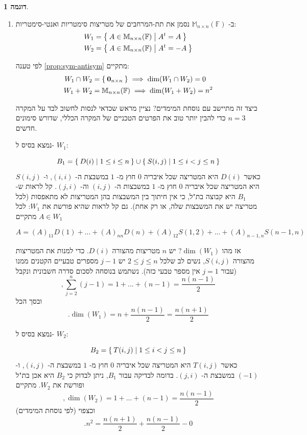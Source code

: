 \documentclass[12pt]{report}
\theoremstyle{plain}
\theoremstyle{definition}
\newtheorem{example}{דוגמה}[chapter]
\newcommand{\F}{\mathbb{F}}
\newcommand{\M}{\mathbb{M}}
\newcommand{\0}{\mathbf{0}}
\begin{document}
\begin{example}
\begin{enumerate}[label=\alph*.]
נציב את המימדים הידועים בנוסחת המימדים ונקבל

$$
.n=n-1+n-1-\dim(H_1\cap H_2) \implies \dim(H_1\cap H_2)=n-2
$$


\item 
ב-
$\M_{n\times n}(\F)$
נסמן את תת-המרחבים של מטריצות סימטריות ואנטי-סימטריות:
$$
\begin{aligned}
W_1&=\Set{A\in \M_{n\times n}(\F)|A^t=A} \\
W_2&=\Set{A\in \M_{n\times n}(\F)|A^t=-A}
\end{aligned}
$$

לפי טענה
\ref{prop:sym-antisym}
מתקיים:
$$
\begin{aligned}
W_1\cap W_2&=\Set{\0_{n\times n}} \implies \dim(W_1\cap W_2)=0 \\
W_1+W_2&=\M_{n\times n}(\F) \implies \dim(W_1+W_2)=n^2
\end{aligned}
$$

כיצד זה מתיישב עם נוסחת המימדים? נציין מראש שכדאי לנסות לחשוב לבד על המקרה
$n=3$
כדי להבין יותר טוב את הפרטים הטכניים של המקרה הכללי, שדורש סימונים חדשים.

נמצא בסיס ל-
$W_1$:

$$
B_1=\Set{D(i)|1\leq i\leq n}\cup\Set{S(i,j)|1\leq i<j\leq n}
$$
כאשר
$D(i)$
היא המטריצה שכל איבריה 
$0$
חוץ מ-
$1$
במשבצת ה-
$(i,i)$,
ו-
$S(i,j)$
היא המטריצה שכל איבריה
$0$
חוץ מ-
$1$
במשבצות ה-
$(i,j)$
וה-
$(j,i)$.
קל לראות ש-
$B_1$
היא קבוצה בת"ל, כי אין חיתוך בין המשבצות בהן המטריצות לא מתאפסות (לכל מטריצה יש את המשבצות שלה, או רק אחת). 
גם קל לראות שהיא פורשת את 
$W_1$: 
לכל 
$A\in W_1$
מתקיים

$$
A=(A)_{11}D(1)+...+(A)_{nn}D(n)+(A)_{12}S(1,2)+...+(A)_{n-1,n}S(n-1,n)
$$

אז מהו
$\dim(W_1)$?
יש 
$n$
מטריצות מהצורה 
$D(i)$.
כדי למנות את המטריצות מהצורה
$S(i,j)$,
נשים לב שלכל
$2\leq j\leq n$
יש 
$j-1$
מספרים טבעיים הקטנים ממנו (עבור 
$j=1$
אין מספר טבעי כזה). נשתמש בנוסחה לסכום סדרה חשבונית ונקבל
$$
,\sum_{j=2}^n(j-1)=1+...+(n-1)=\frac{n(n-1)}{2}
$$
ובסך הכל
$$
.\dim(W_1)=n+\frac{n(n-1)}{2}=\frac{n(n+1)}{2}
$$

נמצא בסיס ל-
$W_2$:

$$
B_2=\Set{T(i,j)|1\leq i<j\leq n}
$$
כאשר
$T(i,j)$
היא המטריצה שכל איבריה 
$0$
חוץ מ-
$1$
במשבצת ה-
$(i,j)$,
ו-
$(-1)$
במשבצת ה-
$(j,i)$.
בדומה לבדיקה עבור
$B_1$,
ניתן לבדוק כי 
$B_2$
היא אכן בת"ל ופורשת את
$W_2$.
מתקיים
$$
,\dim(W_2)=1+...+(n-1)=\frac{n(n-1)}{2}
$$
וכצפוי (לפי נוסחת המימדים)
$$
.n^2=\frac{n(n+1)}{2}+\frac{n(n-1)}{2}-0
$$

\end{enumerate}
\end{example}
\end{document}
